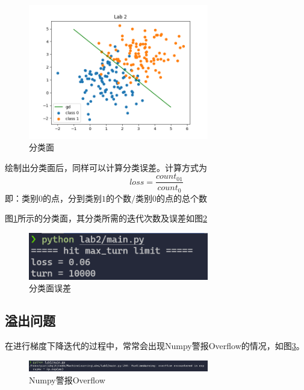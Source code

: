 \begin{figure}[htbp]
    \centering
    \includegraphics[width=0.7\textwidth]{figures/Figure_2.png}
    \caption{分类面}
    \label{sep_equ_figure}
\end{figure}

绘制出分类面后，同样可以计算分类误差。计算方式为
\begin{equation}
    loss = \dfrac{count_{01}}{count_0}
\end{equation}
即：类别$0$的点，分到类别$1$的个数$/$类别$0$的点的总个数

图\ref{sep_equ_figure}所示的分类面，其分类所需的迭代次数及误差如图\ref{loss}

\begin{figure}[htbp]
    \centering
    \includegraphics[width=0.7\textwidth]{figures/Figure_3.png}
    \caption{分类面误差}
    \label{loss}
\end{figure}

\subsection{溢出问题}

在进行梯度下降迭代的过程中，常常会出现Numpy警报Overflow的情况，如图\ref{overflow}。

\begin{figure}[htbp]
    \centering
    \includegraphics[width=0.7\textwidth]{figures/Figure_9.png}
    \caption{Numpy警报Overflow}
    \label{overflow}
\end{figure}

